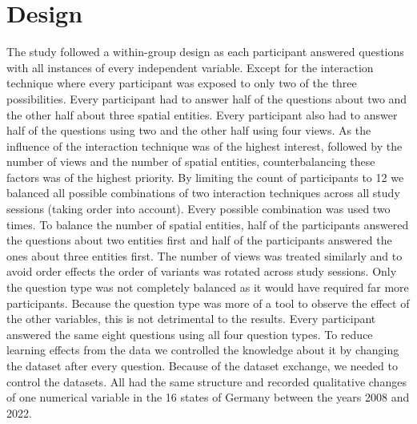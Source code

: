 \section{Design}
The study followed a within-group design as each participant answered questions with all instances of every independent variable. Except for the interaction technique where every participant was exposed to only two of the three possibilities. Every participant had to
answer half of the questions about two and the other half about three spatial entities. Every participant also had to answer half of the
questions using two and the other half using four views. As the influence of the interaction technique was of the highest interest, followed by
the number of views and the number of spatial entities, counterbalancing these factors was of the highest priority. By limiting the count of
participants to 12 we balanced all possible combinations of two interaction techniques across all study sessions (taking order into
account). Every possible combination was used two times. To balance the number of spatial entities, half of the participants answered the
questions about two entities first and half of the participants answered the ones about three entities first. The number of views was
treated similarly and to avoid order effects the order of variants was rotated across study sessions. Only the question type was not
completely balanced as it would have required far more participants. Because the question type was more of a tool to observe the effect of
the other variables, this is not detrimental to the results. Every participant answered the same eight questions using all four question types. To reduce learning effects from the data we controlled the knowledge about it
by changing the dataset after every question. Because of the dataset exchange, we needed to control the datasets. All had the same
structure and recorded qualitative changes of one numerical variable in the 16 states of Germany between the years 2008 and 2022.
